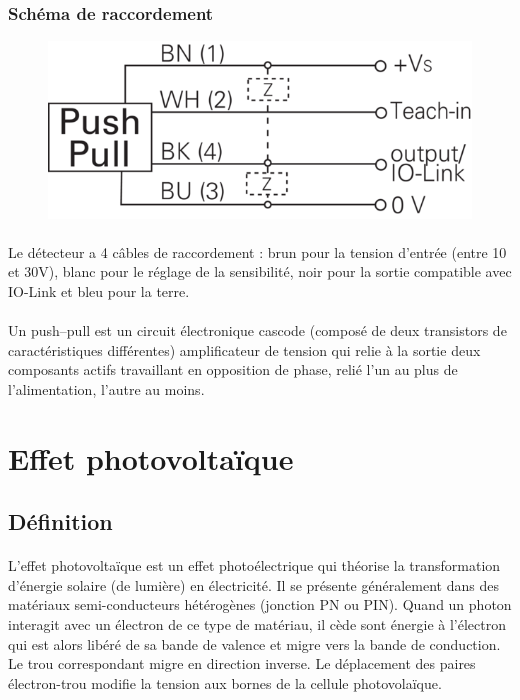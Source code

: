\documentclass{article}
\begin{document}
    \subsubsection{Schéma de raccordement}

    \begin{figure}[H]
        \centering
        \includegraphics[width=0.3\linewidth]{./images/Zchn-5753-1.png}
    \end{figure}

    \paragraph{}
    Le détecteur a 4 câbles de raccordement : brun pour la tension d'entrée (entre 10 et 30V), blanc pour le réglage de la sensibilité, noir pour la sortie compatible avec IO-Link et bleu pour la terre.

    \paragraph{}
    Un push–pull est un circuit électronique cascode (composé de deux transistors de caractéristiques différentes) amplificateur de tension qui relie à la sortie deux composants actifs travaillant en opposition de phase, relié l'un au plus de l'alimentation, l'autre au moins. 


    \newpage
    \section{Effet photovoltaïque}

    \subsection{Définition}
    \paragraph{}
    L'effet photovoltaïque est un effet photoélectrique qui théorise la transformation d'énergie solaire (de lumière) en électricité. Il se présente généralement dans des matériaux semi-conducteurs hétérogènes (jonction PN ou PIN). Quand un photon interagit avec un électron de ce type de matériau, il cède sont énergie  à l'électron qui est alors libéré de sa bande de valence et migre vers la bande de conduction. Le trou correspondant migre en direction inverse. Le déplacement des paires électron-trou modifie la tension aux bornes de la cellule photovolaïque.
    
\end{document}

